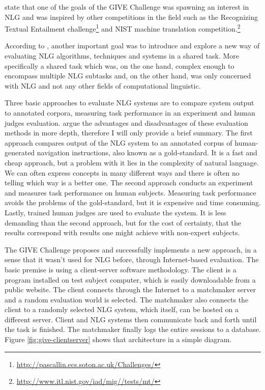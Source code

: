\citet{koller2010first} state that one of the goals of the GIVE Challenge was spawning an interest in NLG and was inspired by other competitions in the field such as the Recognizing Textual Entailment challenge\footnote{\url{http://pascallin.ecs.soton.ac.uk/Challenges/}} and NIST machine
translation competition.\footnote{\url{http://www.itl.nist.gov/iad/mig//tests/mt/}}

According to \citet{koller2010first}, another important goal was to introduce and explore a new way of evaluating NLG algorithms, techniques and systems in a shared task. More specifically a shared task which was, on the one hand, complex enough to encompass multiple NLG subtasks and, on the other hand, was only concerned with NLG and not any other fields of computational linguistic.

Three basic approaches to evaluate NLG systems are to compare system output to annotated corpora, measuring task performance in an experiment and human judges evaluation. \citet{koller2010first} argue the advantages and disadvantages of these evaluation methods in more depth, therefore I will only provide a brief summary. The first approach compares output of the NLG system to an annotated corpus of human-generated navigation instructions, also known as a gold-standard. It is a fast and cheap approach, but a problem with it lies in the complexity of natural language. We can often express concepts in many different ways and there is often no telling which way is a better one. The second approach conducts an experiment and measures task performance on human subjects. Measuring task performance avoids the problems of the gold-standard, but it is expensive and time consuming. Lastly, trained human judges are used to evaluate the system. It is less demanding than the second approach, but for the cost of certainty, that the results correspond with results one might achieve with non-expert subjects.

The GIVE Challenge proposes and successfully implements a new approach, in a sense that it wasn't used for NLG before, through Internet-based evaluation. The basic premise is using a client-server software methodology. The client is a program installed on test subject computer, which is easily downloadable from a public website. The client connects through the Internet to a matchmaker server and a random evaluation world is selected. The matchmaker also connects the client to a randomly selected NLG system, which itself, can be hosted on a different server. Client and NLG systems then communicate back and forth until the task is finished. The matchmaker finally logs the entire sessions to a database. Figure \ref{fig:give-clientserver} shows that architecture in a simple diagram.

